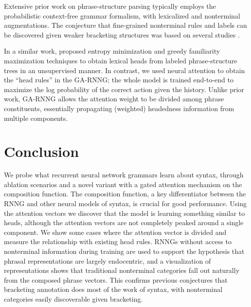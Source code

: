 \documentclass[11pt]{article}
\newcommand{\ask}[1]{\textcolor{orange}{{\textbf{[#1 --\textsc{ask}]}}}}
\newcommand{\lpk}[1]{\textcolor{green}{{\textbf{[#1 --\textsc{lpk}]}}}}
\newcommand{\nascomment}[1]{\textcolor{blue}{{\textbf{[#1 --\textsc{nas}]}}}}
\renewcommand{\ask}[1]{}
\renewcommand{\lpk}[1]{}
\renewcommand{\nascomment}[1]{}
\begin{document}
Extensive prior work on phrase-structure parsing typically employs the probabilistic context-free grammar formalism, with lexicalized \cite{collins_97} and nonterminal \cite{johnson_98,klein_03} augmentations. The conjecture that fine-grained nonterminal rules and labels can be discovered given weaker bracketing structures was based on several studies \cite{chiang_02,klein_02,petrov_2006}. 

In a similar work,  proposed entropy minimization and greedy familiarity maximization techniques to obtain lexical heads from labeled phrase-structure trees in an unsupervised manner. In contrast, we used neural attention to obtain the ``head rules'' in the GA-RNNG; the whole model is trained end-to-end to maximize the log probability of the correct action given the history. Unlike prior work, GA-RNNG allows the attention weight to be divided among phrase constituents, essentially propagating (weighted) headedness information from multiple components. 

\nascomment{be sure to discuss chiang and bikel; petrov and other latent variable PCFG papers}
\lpk{one thing make slav's paper interesting is that he find basically that some of the nonterminal categories need to be more fine-grained than others' (table 1 in http://www.petrovi.de/data/acl06.pdf). It would be interesting if we see something like this in our finding.}


\section{Conclusion}\label{sec:conclusion}
We probe what recurrent neural network grammars learn about syntax, through ablation scenarios and a novel variant with a gated attention mechanism on the composition function. The composition function, a key differentiator between the RNNG and other neural models of syntax, is crucial for good performance. Using the attention vectors we discover that the model is learning something similar to heads, although the attention vectors are not completely peaked around a single component. We show some cases where the attention vector is divided and measure the relationship with existing head rules. RNNGs without access to nonterminal information during training are used to support the hypothesis that phrasal representations are largely endocentric, and a visualization of representations shows that traditional nonterminal categories fall out naturally from the composed phrase vectors. This confirms previous conjectures that bracketing annotation does most of the work of syntax, with nonterminal categories easily discoverable given bracketing.
\end{document}
